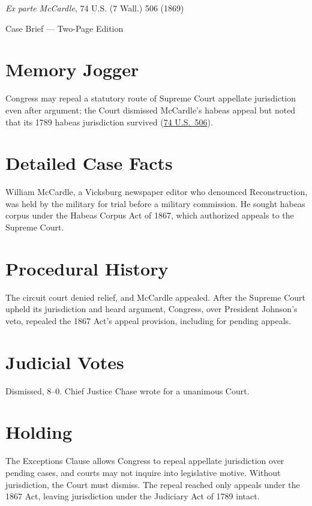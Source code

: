 \documentclass[12pt]{article}
\begin{document}
\begin{center}
{\LARGE \textit{Ex parte McCardle}, 74 U.S. (7 Wall.) 506 (1869)\par}
\vspace{0.5em}
{\large Case Brief --- Two-Page Edition\par}
\end{center}

\section{Memory Jogger}
Congress may repeal a statutory route of Supreme Court appellate jurisdiction even after argument; the Court dismissed McCardle's habeas appeal but noted that its 1789 habeas jurisdiction survived (\href{https://supreme.justia.com/cases/federal/us/74/506/}{74 U.S.\ 506}).

\section{Detailed Case Facts}
William McCardle, a Vicksburg newspaper editor who denounced Reconstruction, was held by the military for trial before a military commission. He sought habeas corpus under the Habeas Corpus Act of 1867, which authorized appeals to the Supreme Court.

\section{Procedural History}
The circuit court denied relief, and McCardle appealed. After the Supreme Court upheld its jurisdiction and heard argument, Congress, over President Johnson's veto, repealed the 1867 Act's appeal provision, including for pending appeals.

\section{Judicial Votes}
Dismissed, 8--0. Chief Justice Chase wrote for a unanimous Court.

\section{Holding}
The Exceptions Clause allows Congress to repeal appellate jurisdiction over pending cases, and courts may not inquire into legislative motive. Without jurisdiction, the Court must dismiss. The repeal reached only appeals under the 1867 Act, leaving jurisdiction under the Judiciary Act of 1789 intact.
\end{document}
